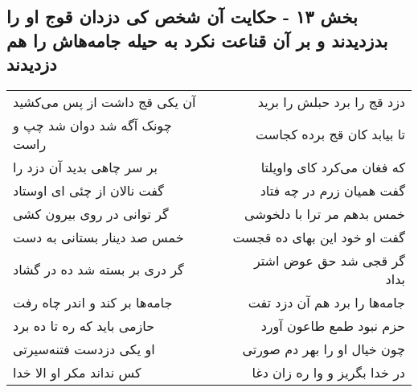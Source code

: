 \begin{center}
\section*{بخش ۱۳ - حکایت آن شخص کی دزدان قوج او را بدزدیدند  و بر آن قناعت نکرد به حیله جامه‌هاش را هم دزدیدند}
\label{sec:sh013}
\begin{longtable}{l p{0.5cm} r}
آن یکی قج داشت از پس می‌کشید
&&
دزد قج را برد حبلش را برید
\\
چونک آگه شد دوان شد چپ و راست
&&
تا بیابد کان قج برده کجاست
\\
بر سر چاهی بدید آن دزد را
&&
که فغان می‌کرد کای واویلتا
\\
گفت نالان از چئی ای اوستاد
&&
گفت همیان زرم در چه فتاد
\\
گر توانی در روی بیرون کشی
&&
خمس بدهم مر ترا با دلخوشی
\\
خمس صد دینار بستانی به دست
&&
گفت او خود این بهای ده قجست
\\
گر دری بر بسته شد ده در گشاد
&&
گر قجی شد حق عوض اشتر بداد
\\
جامه‌ها بر کند و اندر چاه رفت
&&
جامه‌ها را برد هم آن دزد تفت
\\
حازمی باید که ره تا ده برد
&&
حزم نبود طمع طاعون آورد
\\
او یکی دزدست فتنه‌سیرتی
&&
چون خیال او را بهر دم صورتی
\\
کس نداند مکر او الا خدا
&&
در خدا بگریز و وا ره زان دغا
\\
\end{longtable}
\end{center}
